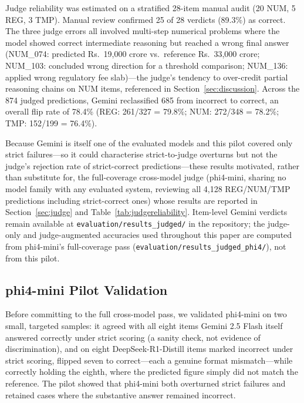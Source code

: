 Judge reliability was estimated on a stratified 28-item manual audit (20 NUM, 5 REG, 3 TMP). Manual review confirmed 25 of 28 verdicts (89.3\%) as correct. The three judge errors all involved multi-step numerical problems where the model showed correct intermediate reasoning but reached a wrong final answer (NUM\_074: predicted Rs.~19,000 crore vs.\ reference Rs.~33,000 crore; NUM\_103: concluded wrong direction for a threshold comparison; NUM\_136: applied wrong regulatory fee slab)---the judge's tendency to over-credit partial reasoning chains on NUM items, referenced in Section~\ref{sec:discussion}. Across the 874 judged predictions, Gemini reclassified 685 from incorrect to correct, an overall flip rate of 78.4\% (REG: 261/327 = 79.8\%; NUM: 272/348 = 78.2\%; TMP: 152/199 = 76.4\%).

Because Gemini is itself one of the evaluated models and this pilot covered only strict failures---so it could characterise strict-to-judge overturns but not the judge's rejection rate of strict-correct predictions---these results motivated, rather than substitute for, the full-coverage cross-model judge (phi4-mini, sharing no model family with any evaluated system, reviewing all 4{,}128 REG/NUM/TMP predictions including strict-correct ones) whose results are reported in Section~\ref{sec:judge} and Table~\ref{tab:judgereliability}. Item-level Gemini verdicts remain available at \texttt{evaluation/results\_judged/} in the repository; the judge-only and judge-augmented accuracies used throughout this paper are computed from phi4-mini's full-coverage pass (\texttt{evaluation/results\_judged\_phi4/}), not from this pilot.

\subsection{phi4-mini Pilot Validation}

Before committing to the full cross-model pass, we validated phi4-mini on two small, targeted
samples: it agreed with all eight items Gemini 2.5 Flash itself answered correctly under strict
scoring (a sanity check, not evidence of discrimination), and on eight DeepSeek-R1-Distill items
marked incorrect under strict scoring, flipped seven to correct---each a genuine format
mismatch---while correctly holding the eighth, where the predicted figure simply did not match the
reference. The pilot showed that phi4-mini both overturned strict failures and retained cases where
the substantive answer remained incorrect.

